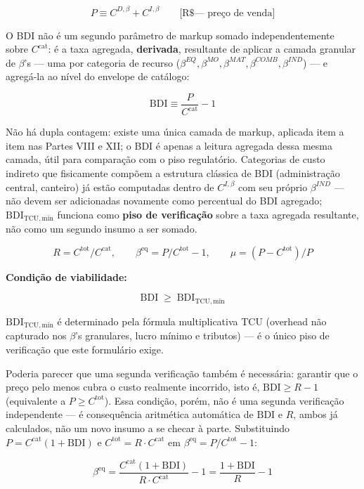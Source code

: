\documentclass[
  10pt,
]{article}
\begin{document}
\[P \equiv C^{D,\beta}+C^{I,\beta} \qquad\text{[R\$ — preço de venda]}\]

O BDI não é um segundo parâmetro de markup somado independentemente
sobre \(C^{\mathrm{cat}}\): é a taxa agregada, \textbf{derivada},
resultante de aplicar a camada granular de \(\beta\)'s --- uma por
categoria de recurso
(\(\beta^{EQ},\beta^{MO},\beta^{MAT},\beta^{COMB},\beta^{IND}\)) --- e
agregá-la ao nível do envelope de catálogo:

\[\boxed{\mathrm{BDI} \equiv \frac{P}{C^{\mathrm{cat}}}-1}\]

Não há dupla contagem: existe uma única camada de markup, aplicada item
a item nas Partes VIII e XII; o BDI é apenas a leitura agregada dessa
mesma camada, útil para comparação com o piso regulatório. Categorias de
custo indireto que fisicamente compõem a estrutura clássica de BDI
(administração central, canteiro) já estão computadas dentro de
\(C^{I,\beta}\) com seu próprio \(\beta^{IND}\) --- não devem ser
adicionadas novamente como percentual do BDI agregado;
\(\mathrm{BDI}_{\mathrm{TCU,min}}\) funciona como \textbf{piso de
verificação} sobre a taxa agregada resultante, não como um segundo
insumo a ser somado.

\[R = C^{\mathrm{tot}}/C^{\mathrm{cat}}, \qquad \beta^{\mathrm{eq}} = P/C^{\mathrm{tot}}-1, \qquad \mu = (P-C^{\mathrm{tot}})/P\]

\textbf{Condição de viabilidade:}

\[\boxed{\mathrm{BDI} \;\ge\; \mathrm{BDI}_{\mathrm{TCU,min}}}\]

\(\mathrm{BDI}_{\mathrm{TCU,min}}\) é determinado pela fórmula
multiplicativa TCU (overhead não capturado nos \(\beta\)'s granulares,
lucro mínimo e tributos) --- é o único piso de verificação que este
formulário exige.

Poderia parecer que uma segunda verificação também é necessária:
garantir que o preço pelo menos cubra o custo realmente incorrido, isto
é, \(\mathrm{BDI}\ge R-1\) (equivalente a \(P\ge C^{\mathrm{tot}}\)).
Essa condição, porém, não é uma segunda verificação independente --- é
consequência aritmética automática de \(\mathrm{BDI}\) e \(R\), ambos já
calculados, não um novo insumo a se checar à parte. Substituindo
\(P=C^{\mathrm{cat}}(1+\mathrm{BDI})\) e
\(C^{\mathrm{tot}}=R\cdot C^{\mathrm{cat}}\) em
\(\beta^{\mathrm{eq}}=P/C^{\mathrm{tot}}-1\):

\[\beta^{\mathrm{eq}} = \frac{C^{\mathrm{cat}}(1+\mathrm{BDI})}{R\cdot C^{\mathrm{cat}}}-1 = \frac{1+\mathrm{BDI}}{R}-1\]
\end{document}
